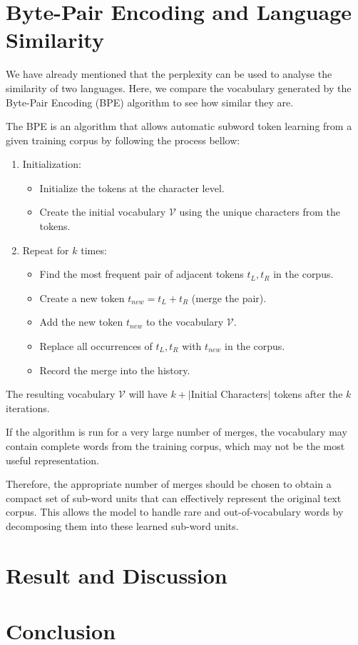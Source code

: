 \section{Byte-Pair Encoding and Language Similarity}
We have already mentioned that the perplexity can be used to analyse the similarity of two languages. Here, we compare the vocabulary generated by the Byte-Pair Encoding (BPE) algorithm to see how similar they are.

The BPE is an algorithm that allows automatic subword token learning from a given training corpus by following the process bellow:
\begin{enumerate}
    \item Initialization:
    \begin{itemize}
    \item Initialize the tokens at the character level.
    \item Create the initial vocabulary $\mathcal{V}$ using the unique characters from the tokens.
    \end{itemize}
    
    \item Repeat for $k$ times:
    \begin{itemize}
        \item Find the most frequent pair of adjacent tokens $t_L, t_R$ in the corpus.
        \item Create a new token $t_{new} = t_L + t_R$ (merge the pair).
        \item Add the new token $t_{new}$ to the vocabulary $\mathcal{V}$.
        \item Replace all occurrences of $t_L, t_R$ with $t_{new}$ in the corpus.
        \item Record the merge into the history.
    \end{itemize}
\end{enumerate}

The resulting vocabulary $\mathcal{V}$ will have $k + |$Initial Characters$|$ tokens after the $k$ iterations.

If the algorithm is run for a very large number of merges, the vocabulary may contain complete words from the training corpus, which may not be the most useful representation.

Therefore, the appropriate number of merges should be chosen to obtain a compact set of sub-word units that can effectively represent the original text corpus. This allows the model to handle rare and out-of-vocabulary words by decomposing them into these learned sub-word units.
\section{Result and Discussion}

\section{Conclusion}